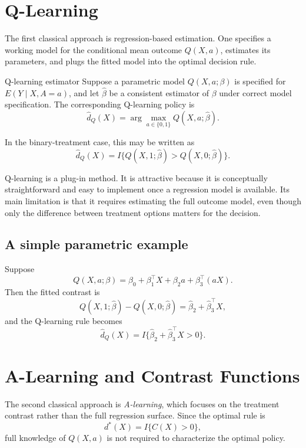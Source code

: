 \documentclass[master.tex]{subfiles}
\begin{document}
\section{Q-Learning}
\label{w14:sec:qlearning}

The first classical approach is regression-based estimation. One specifies a working model for the conditional mean outcome \(Q(X,a)\), estimates its parameters, and plugs the fitted model into the optimal decision rule.

\begin{defn}{Q-learning estimator}
\label{w14:defn:qlearn}
Suppose a parametric model \(Q(X,a;\beta)\) is specified for
\(E(Y\mid X,A=a)\), and let \(\hat\beta\) be a consistent estimator of \(\beta\)
under correct model specification. The corresponding Q-learning policy is
\[
\hat d_Q(X)=\arg\max_{a\in\{0,1\}} Q(X,a;\hat\beta).
\]
\end{defn}

In the binary-treatment case, this may be written as
\[
\hat d_Q(X)=I\{Q(X,1;\hat\beta)>Q(X,0;\hat\beta)\}.
\]

\begin{remark}
Q-learning is a plug-in method. It is attractive because it is conceptually straightforward and easy to implement once a regression model is available. Its main limitation is that it requires estimating the full outcome model, even though only the difference between treatment options matters for the decision.
\end{remark}

\subsection{A simple parametric example}

Suppose
\[
Q(X,a;\beta)=\beta_0+\beta_1^\top X+\beta_2 a+\beta_3^\top(aX).
\]
Then the fitted contrast is
\[
Q(X,1;\hat\beta)-Q(X,0;\hat\beta)=\hat\beta_2+\hat\beta_3^\top X,
\]
and the Q-learning rule becomes
\[
\hat d_Q(X)=I\{\hat\beta_2+\hat\beta_3^\top X>0\}.
\]

\section{A-Learning and Contrast Functions}
\label{w14:sec:alearning}

The second classical approach is \emph{A-learning}, which focuses on the treatment contrast rather than the full regression surface. Since the optimal rule is
\[
d^\ast(X)=I\{C(X)>0\},
\]
full knowledge of \(Q(X,a)\) is not required to characterize the optimal policy.
\end{document}
